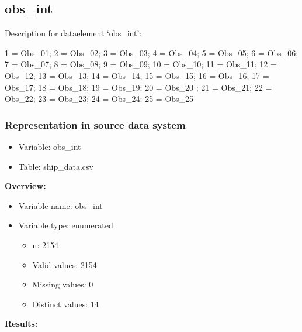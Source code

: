 \documentclass[
]{article}
\providecommand{\tightlist}{%
  \setlength{\itemsep}{0pt}\setlength{\parskip}{0pt}}
\begin{document}
\hypertarget{obs_int}{%
\subsection{obs\_int}\label{obs_int}}

Description for dataelement `obs\_int':

1 = Obs\_01; 2 = Obs\_02; 3 = Obs\_03; 4 = Obs\_04; 5 = Obs\_05; 6 =
Obs\_06; 7 = Obs\_07; 8 = Obs\_08; 9 = Obs\_09; 10 = Obs\_10; 11 =
Obs\_11; 12 = Obs\_12; 13 = Obs\_13; 14 = Obs\_14; 15 = Obs\_15; 16 =
Obs\_16; 17 = Obs\_17; 18 = Obs\_18; 19 = Obs\_19; 20 = Obs\_20 ; 21 =
Obs\_21; 22 = Obs\_22; 23 = Obs\_23; 24 = Obs\_24; 25 = Obs\_25

\hypertarget{representation-in-source-data-system-19}{%
\subsubsection{\texorpdfstring{Representation in \textbf{source} data
system}{Representation in source data system}}\label{representation-in-source-data-system-19}}

\begin{itemize}
\tightlist
\item
  Variable: obs\_int
\item
  Table: ship\_data.csv
\end{itemize}

\textbf{Overview:}

\begin{itemize}
\tightlist
\item
  Variable name: obs\_int
\item
  Variable type: enumerated

  \begin{itemize}
  \tightlist
  \item
    n: 2154
  \item
    Valid values: 2154
  \item
    Missing values: 0
  \item
    Distinct values: 14
  \end{itemize}
\end{itemize}

\textbf{Results:}\\
\end{document}
